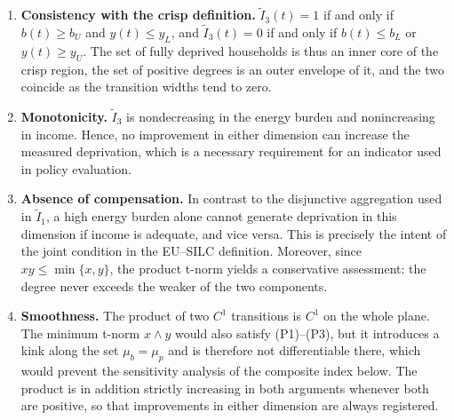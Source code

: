 \documentclass[11pt,a4paper]{article}
\begin{document}
\begin{enumerate}[label=(P\arabic*)]
\item \textbf{Consistency with the crisp definition.}
\(\widetilde I_3(t)=1\) if and only if \(b(t)\ge b_U\) and \(y(t)\le y_L\), and \(\widetilde I_3(t)=0\) if and only if \(b(t)\le b_L\) or \(y(t)\ge y_U\). The set of fully deprived households is thus an inner core of the crisp region, the set of positive degrees is an outer envelope of it, and the two coincide as the transition widths tend to zero.

\item \textbf{Monotonicity.}
\(\widetilde I_3\) is nondecreasing in the energy burden and nonincreasing in income. Hence, no improvement in either dimension can increase the measured deprivation, which is a necessary requirement for an indicator used in policy evaluation.

\item \textbf{Absence of compensation.}
In contrast to the disjunctive aggregation used in \(\widetilde I_1\), a high energy burden alone cannot generate deprivation in this dimension if income is adequate, and vice versa. This is precisely the intent of the joint condition in the EU--SILC definition. Moreover, since \(xy\le\min\{x,y\}\), the product t-norm yields a conservative assessment: the degree never exceeds the weaker of the two components.

\item \textbf{Smoothness.}
The product of two \(C^1\) transitions is \(C^1\) on the whole plane. The minimum t-norm \(x\wedge y\) would also satisfy (P1)--(P3), but it introduces a kink along the set \(\mu_b=\mu_p\) and is therefore not differentiable there, which would prevent the sensitivity analysis of the composite index below. The product is in addition strictly increasing in both arguments whenever both are positive, so that improvements in either dimension are always registered.
\end{enumerate}
\end{document}

